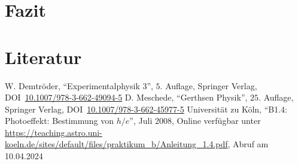 \documentclass[12pt,a4paper]{scrartcl}
\numberwithin{equation}{section} %
\begin{document}
\clearpage
\hypertarget{fazit}{%
\section{Fazit}\label{fazit}}

\clearpage
\hypertarget{literatur}{%
\section{Literatur}\label{literatur}}
\renewcommand{\section}[2]{}

\begin{thebibliography}{99}
	W. Demtröder, ``Experimentalphysik 3'', $5.$ Auflage, Springer Verlag,
	DOI~\href{https://doi.org/10.1007/978-3-662-49094-5}{10.1007/978-3-662-49094-5}
	D. Meschede, ``Gerthsen Physik'', $25.$ Auflage, Springer Verlag,
	DOI~\href{https://doi.org/10.1007/978-3-662-45977-5}{10.1007/978-3-662-45977-5}
		Universität zu Köln, ``B1.4: Photoeffekt: Bestimmung von $h/e$'', Juli 2008,
		Online verfügbar unter \url{https://teaching.astro.uni-koeln.de/sites/default/files/praktikum_b/Anleitung_1.4.pdf},
		Abruf am 10.04.2024
\end{thebibliography}
\end{document}
